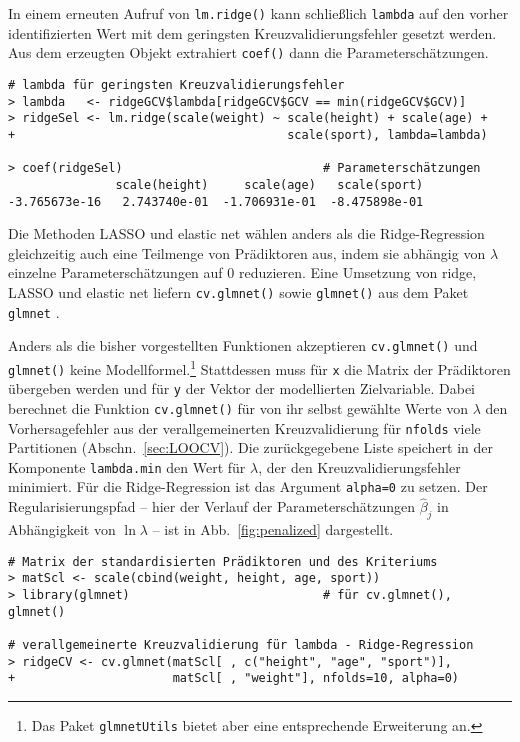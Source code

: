 In einem erneuten Aufruf von \lstinline!lm.ridge()! kann schließlich \lstinline!lambda! auf den vorher identifizierten Wert mit dem geringsten Kreuzvalidierungsfehler gesetzt werden. Aus dem erzeugten Objekt extrahiert \lstinline!coef()! dann die Parameterschätzungen.
\begin{lstlisting}
# lambda für geringsten Kreuzvalidierungsfehler
> lambda   <- ridgeGCV$lambda[ridgeGCV$GCV == min(ridgeGCV$GCV)]
> ridgeSel <- lm.ridge(scale(weight) ~ scale(height) + scale(age) +
+                                      scale(sport), lambda=lambda)

> coef(ridgeSel)                            # Parameterschätzungen
               scale(height)     scale(age)   scale(sport)
-3.765673e-16   2.743740e-01  -1.706931e-01  -8.475898e-01
\end{lstlisting}

Die Methoden LASSO und elastic net wählen anders als die Ridge-Regression gleichzeitig auch eine Teilmenge von Prädiktoren aus, indem sie abhängig von $\lambda$ einzelne Parameterschätzungen auf $0$ reduzieren. Eine Umsetzung von ridge, LASSO und elastic net liefern \lstinline!cv.glmnet()! sowie \lstinline!glmnet()! aus dem Paket \lstinline!glmnet! \cite{Friedman2010}.

Anders als die bisher vorgestellten Funktionen akzeptieren \lstinline!cv.glmnet()! und \lstinline!glmnet()! keine Modellformel.\footnote{Das Paket \lstinline!glmnetUtils! \cite{Ooi2017} bietet aber eine entsprechende Erweiterung an.} Stattdessen muss für \lstinline!x! die Matrix der Prädiktoren übergeben werden und für \lstinline!y! der Vektor der modellierten Zielvariable. Dabei berechnet die Funktion \lstinline!cv.glmnet()! für von ihr selbst gewählte Werte von $\lambda$ den Vorhersagefehler aus der verallgemeinerten Kreuzvalidierung für \lstinline!nfolds! viele Partitionen (Abschn.\ \ref{sec:LOOCV}). Die zurückgegebene Liste speichert in der Komponente \lstinline!lambda.min! den Wert für $\lambda$, der den Kreuzvalidierungsfehler minimiert. Für die Ridge-Regression ist das Argument \lstinline!alpha=0! zu setzen. Der Regularisierungspfad -- hier der Verlauf der Parameterschätzungen $\hat{\beta}_{j}$ in Abhängigkeit von $\ln \lambda$ -- ist in Abb.\ \ref{fig:penalized} dargestellt.
\begin{lstlisting}
# Matrix der standardisierten Prädiktoren und des Kriteriums
> matScl <- scale(cbind(weight, height, age, sport))
> library(glmnet)                           # für cv.glmnet(), glmnet()

# verallgemeinerte Kreuzvalidierung für lambda - Ridge-Regression
> ridgeCV <- cv.glmnet(matScl[ , c("height", "age", "sport")],
+                      matScl[ , "weight"], nfolds=10, alpha=0)
\end{lstlisting}

